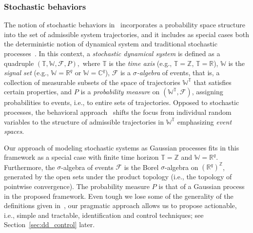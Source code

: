 \documentclass[letterpaper, 10 pt, conference]{ieeeconf}
\begin{document}
\subsubsection{Stochastic behaviors}
The notion of stochastic behaviors in~\cite{baggio2017lti} incorporates a probability space structure into the set of admissible system trajectories, and it includes as special cases both the deterministic notion of dynamical system and traditional stochastic processes~\cite{doob1953stochastic}. 
In this context, a \emph{stochastic dynamical system} is defined as a quadruple  
$
(\mathbb{T}, \mathbb{W}, \mathcal{F}, P),
$
where \(\mathbb{T}\) is the \emph{time axis} (e.g., \(\mathbb{T} = \mathbb{Z}\), \(\mathbb{T} = \mathbb{R}\)), \(\mathbb{W}\) is the \emph{signal set} (e.g.,  \(\mathbb{W} = \mathbb{R}^q\) or \(\mathbb{W} = \mathbb{C}^q\)), \(\mathcal{F}\) is a \emph{$\sigma$-algebra} of events, that is, a collection of measurable subsets of the space of trajectories \(\mathbb{W}^\mathbb{T}\) that satisfies certain properties, and \(P\) is a \emph{probability measure} on \((\mathbb{W}^\mathbb{T}, \mathcal{F})\), assigning probabilities to events, i.e., to entire sets of trajectories.
Opposed to stochastic processes, the behavioral approach~\cite{willems2012open,baggio2017lti} shifts the focus from individual random variables to the structure of admissible trajectories in \( \mathbb{W}^\mathbb{T} \) emphasizing \emph{event spaces}.

Our approach of modeling stochastic systems as Gaussian processes fits in this framework as a special case with finite time horizon $\mathbb{T} = \mathbb{Z}$ and $\mathbb{W} = \mathbb{R}^q$.
Furthermore, the $\sigma$-algebra of events \(\mathcal{F}\) is the Borel $\sigma$-algebra on $(\mathbb{R}^q)^{\mathbb{Z}}$, generated by the open sets under the product topology (i.e., the topology of pointwise convergence).
The probability measure \(P\) is that of a Gaussian process in the proposed framework.
Even tough we lose some of the generality of the definitions given in~\cite{willems2012open,baggio2017lti}, our pragmatic approach allows us to propose actionable, i.e., simple and tractable, identification and control techniques; see Section~\ref{sec:dd_control} later.
\end{document}

